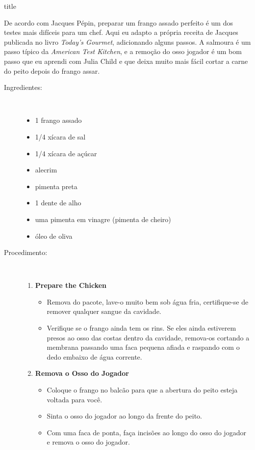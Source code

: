 \documentclass [11pt, letterpaper] {article}
\begin{document}
 {title}

De acordo com Jacques P\'epin, preparar um frango assado perfeito é um dos testes mais difíceis para um chef. Aqui eu adapto a própria receita de Jacques publicada no livro {\it Today's Gourmet}, adicionando alguns passos. A salmoura é um passo t\'ipico da {\it American Test Kitchen}, e a remoção do osso jogador é um bom passo que eu aprendi com Julia Child e que deixa muito mais fácil cortar a carne do peito depois do frango assar.
 
\begin {description}

\item [Ingredientes:] \ \\
\begin {itemize}
\item 1 frango assado
\item 1/4 xícara de sal
\item 1/4 xícara de açúcar
\item alecrim
\item pimenta preta
\item 1 dente de alho
\item uma pimenta em vinagre (pimenta de cheiro)
\item \'oleo de oliva
\end {itemize}

\item [Procedimento:] \ \\

\begin {enumerate}
\item {\bf Prepare the Chicken}
\begin {itemize}
\item Remova do pacote, lave-o muito bem sob água fria, certifique-se de remover qualquer sangue da cavidade.
\item Verifique se o frango ainda tem os rins. Se eles ainda estiverem presos ao osso das costas dentro da cavidade, remova-os cortando a membrana passando uma faca pequena afiada e raspando com o dedo embaixo de água corrente.
\end {itemize}

\item {\bf Remova o Osso do Jogador}
\begin {itemize}
\item Coloque o frango no balcão para que a abertura do peito esteja voltada para você.
\item Sinta o osso do jogador ao longo da frente do peito.
\item Com uma faca de ponta, faça incisões ao longo do osso do jogador e remova o osso do jogador.
\end {itemize}



\end{enumerate}
\end{description}
\end{document}
